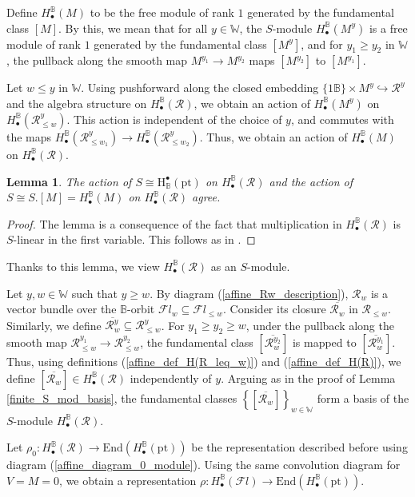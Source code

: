 \documentclass[11pt]{article}
\newcommand{\R}{\mathcal{R}}
\newcommand{\bbB}{\mathbb{B}}
\newcommand{\1}{\mathbb{1}}
\newcommand{\tW}{\mathbb{W}}
\newcommand{\HBM}[2]{H_\bullet^{#1}(#2)}
\newcommand{\Fl}{\mathcal{F}l}
\newcommand{\End}{\text{End}}
\newcommand{\pt}{\text{pt}}
\renewcommand{\subset}{\subseteq}
\newtheorem{lemma}[theorem]{Lemma}
\theoremstyle{definition}
\numberwithin{equation}{section}
\begin{document}
Define $\HBM{\bbB}{M}$ to be the free module of rank $1$ generated by the fundamental class $[M]$. By this, we mean that for all $y\in \tW$, the $S$-module $\HBM{\bbB}{M^y}$ is a free module of rank $1$ generated by the fundamental class $[M^y]$, and for $y_1\geq y_2$ in $\tW$, the pullback along the smooth map $M^{y_1} \rightarrow M^{y_2}$ maps $[M^{y_2}]$ to $[M^{y_1}]$.

Let $w\leq y$ in $\tW$. Using pushforward along the closed embedding $\{1\bbB\} \times M^y \hookrightarrow \R^y$ and the algebra structure on $\HBM{\bbB}{\R}$, we obtain an action of $\HBM{\bbB}{M^y}$ on $\HBM{\bbB}{\R^y_{\leq w}}$. This action is independent of the choice of $y$, and commutes with the maps $\HBM{\bbB}{\R^y_{\leq w_1}} \rightarrow \HBM{\bbB}{\R^y_{\leq w_2}}$. Thus, we obtain an action of $\HBM{\bbB}{M}$ on $\HBM{\bbB}{\R}$.

\begin{lemma}
    The action of $S\cong \text{H}^\bullet_{\bbB}(\pt)$ on $\HBM{\bbB}{\R}$ and the action of $S \cong S.[M] = \HBM{\bbB}{M}$ on $\HBM{\bbB}{\R}$ agree.
\end{lemma}

\begin{proof}
    The lemma is a consequence of the fact that multiplication in $\HBM{\bbB}{\R}$ is $S$-linear in the first variable. This follows as in \cite[Theorem 3.10]{BFN}.
\end{proof}

Thanks to this lemma, we view $\HBM{\bbB}{\R}$ as an $S$-module. 

Let $y, w\in \tW$ such that $y\geq w$. By diagram (\ref{affine_Rw_description}), $\R_w$ is a vector bundle over the $\bbB$-orbit $\Fl_w \subset\Fl_{\leq w}$. Consider its closure  $\overline{\R_w}$ in $\R_{\leq w}$. Similarly, we define $\overline{\R^y_w} \subset \R^y_{\leq w}$. For $y_1 \geq y_2 \geq w$, under the pullback along the smooth map $\R^{y_1}_{\leq w} \rightarrow \R^{y_2}_{\leq w}$, the fundamental class $[\overline{\R^{y_2}_w}]$ is mapped to $[\overline{\R^{y_1}_w}]$. Thus, using definitions (\ref{affine_def_H(R_leq_w)}) and (\ref{affine_def_H(R)}), we define $[\overline{\R_w}] \in \HBM{\bbB}{\R}$ independently of $y$. Arguing as in the proof of Lemma \ref{finite_S_mod_basis}, the fundamental classes $\left\{[\overline{\R_w}]\right\}_{w\in \tW}$ form a basis of the $S$-module $\HBM{\bbB}{\R}$.

Let $\rho_0 : \HBM{\bbB}{\R} \rightarrow \End(\HBM{\bbB}{\pt})$ be the representation described before using diagram (\ref{affine_diagram_0_module}). Using the same convolution
diagram for $V=M=0$, we obtain a representation $\rho : \HBM{\bbB}{\Fl} \rightarrow \End(\HBM{\bbB}{\pt})$.
\end{document}
